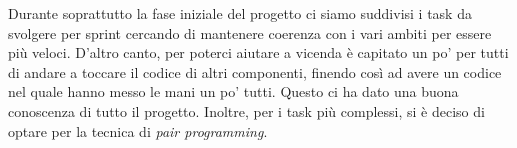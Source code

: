 Durante soprattutto la fase iniziale del progetto ci siamo suddivisi i task da svolgere per sprint cercando di mantenere coerenza con i vari ambiti per essere più veloci.
D'altro canto, per poterci aiutare a vicenda è capitato un po' per tutti di andare a toccare il codice di altri componenti, finendo così ad avere un codice nel quale hanno messo le mani un po' tutti.
Questo ci ha dato una buona conoscenza di tutto il progetto.
Inoltre, per i task più complessi, si è deciso di optare per la tecnica di \textit{pair programming}.